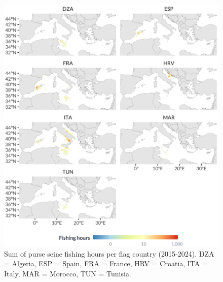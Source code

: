 \begin{figure}[H]
    \centering
    \includegraphics[width=1\linewidth, trim=0 0 0 0,clip]{Figures/plots/seines_countries.pdf}
    \caption{Sum of purse seine fishing hours per flag country (2015-2024). DZA = Algeria, ESP = Spain, FRA = France, 
    HRV = Croatia, ITA = Italy, MAR = Morocco, TUN = Tunisia.}
    \label{fig:seine_effort_countries}
\end{figure}